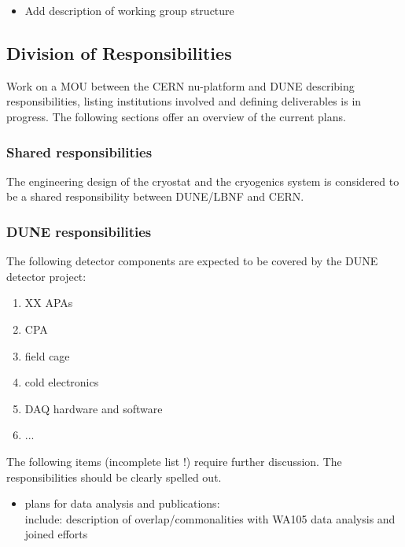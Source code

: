\begin{itemize}

\item Add description of working group structure 

\end{itemize}



\subsection{Division of Responsibilities}

Work on a MOU between the CERN nu-platform and DUNE describing responsibilities, listing institutions involved and defining deliverables is in progress. The following sections offer an overview of the current plans.

\subsubsection{Shared responsibilities}

The engineering design of the cryostat and the cryogenics system is considered to be a shared responsibility between DUNE/LBNF and CERN.

\subsubsection{DUNE responsibilities}

The following detector components are expected to be covered by the DUNE detector project:
\begin{enumerate}
\item XX APAs
\item CPA
\item field cage
\item cold electronics
\item DAQ hardware and software
\item ...
\end{enumerate}

The following items (incomplete list !) require further discussion. The responsibilities should be clearly spelled out.

\begin{itemize}

\item plans for data analysis and publications:\\
include: description of overlap/commonalities with WA105 data analysis and joined efforts

\end{itemize}




